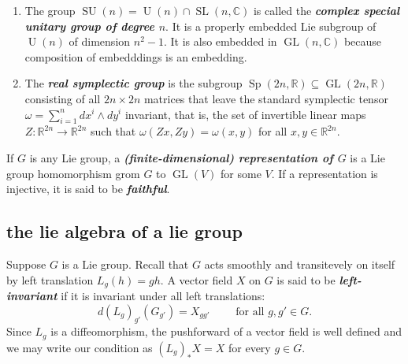 \begin{example}
\begin{enumerate}
		\item The group $\operatorname{SU}(n)=\operatorname{U}(n)\cap\operatorname{SL}(n,\mathbb{C})$ is called the \textbf{\textit{complex special unitary group of degree $n$}}. It is a properly embedded Lie subgroup of $\operatorname{U}(n)$ of dimension $n^2-1$. It is also embedded in $\operatorname{GL}(n,\mathbb{C})$ because composition of embedddings is an embedding.
		\item The \textbf{\textit{real symplectic group}} is the subgroup $\operatorname{Sp}(2n,\mathbb{R})\subseteq\operatorname{GL}(2n,\mathbb{R})$ consisting of all $2n\times2n$ matrices that leave the standard symplectic tensor $\omega=\sum_{i=1}^ndx^i\wedge dy^i$ invariant, that is, the set of invertible linear maps $Z:\mathbb{R}^{2n}\to\mathbb{R}^{2n}$ such that $\omega(Zx,Zy)=\omega(x,y)$ for all $x,y\in\mathbb{R}^{2n}$.
	\end{enumerate}
\end{example}
\begin{defn}[Extra]
	If $G$ is any Lie group, a \textbf{\textit{(finite-dimensional) representation of $G$}} is a Lie group homomorphism grom $G$ to $\operatorname{GL}(V)$ for some $V$. If a representation is injective, it is said to be \textbf{\textit{faithful}}.
\end{defn}
\subsection{the lie algebra of a lie group}
Suppose $G$ is a Lie group. Recall that $G$ acts smoothly and transitevely on itself by left translation $L_g(h)=gh$. A vector field $X$ on $G$ is said to be \textbf{\textit{left-invariant}} if it is invariant under all left translations:
\[d(L_g)_{g'}(G_{g'})=X_{gg'}\qquad\text{ for all }g,g'\in G.\]
Since $L_g$ is a diffeomorphism, the pushforward of a vector field is well defined and we may write our condition as $(L_g)_*X=X$ for every $g\in G$.

